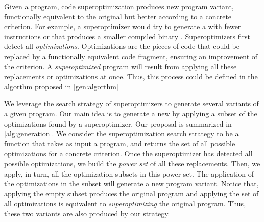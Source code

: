 Given a program, code superoptimization produces new program variant, functionally equivalent to the original but better according to a concrete criterion. For example, a superoptimizer would try to generate a with fewer instructions or that produces a smaller compiled binary \cite{1987_Massalin_Sueroptimizer}. Superoptimizers first detect all \emph{optimizations}. Optimizations are the pieces of code that could be replaced by a functionally equivalent code fragment, ensuring an improvement of the criterion. A \emph{superoptimized} program will result from applying all these replacements or optimizations at once. Thus, this process could be defined in the algorthm proposed in \autoref{gen:algorthm}


We leverage the search strategy of superoptimizers to generate several variants of a given program. Our main idea is to generate a new by applying a subset of the optimizations found by a superoptimizer. Our proposal is summarized in \autoref{alg:generation}. We consider the superoptimization search strategy to be a function that takes as input a program, and returns the set of all possible optimizations for a concrete criterion. Once the superoptimizer has detected all possible optimizations, we build the \emph{power set} of all these replacements. Then, we apply, in turn, all the optimization subsets in this power set. The application of the optimizations in the subset will generate a new program variant. Notice that, applying the empty subset produces the original program and applying the set of all optimizations is equivalent to \emph{superoptimizing} the original program. Thus, these two variants are also produced by our strategy.






